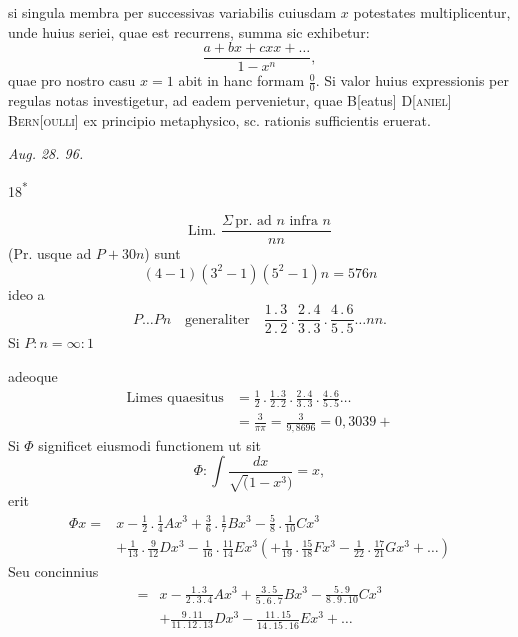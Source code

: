 si singula membra per successivas variabilis cuiusdam $x$ potestates
multiplicentur, unde huius seriei, quae est recurrens, summa sic exhibetur:
\[\frac{a+bx+cxx+\ldots}{1-x^n},\]
\noindent quae pro nostro casu $x=1$ abit in hanc formam $\frac00$. Si valor huius expressionis
per regulas notas investigetur, ad eadem pervenietur, quae B[eatus]
D[\textsc{aniel}] \textsc{Bern[oulli]} ex principio metaphysico, sc. rationis sufficientis eruerat.
\par\noindent\hfill\textit{Aug. 28. 96.}\par
\ClosingRule
\vfill\noindent\hfill18\textsuperscript{*}\hspace*{.12\linewidth}\par
\clearpage
{}
\[\text{Lim. }\frac{\Sigma\,\text{pr. ad }n\text{ infra }n}{nn}\]
\noindent (Pr. usque ad $P+30n$) sunt
\[(4-1)(3^2-1)(5^2-1)n=576n\]
\noindent ideo a
\[P\ldots Pn\quad\text{generaliter}\quad
\frac{1\mathpunct{.}3}{2\mathpunct{.}2}\mathpunct{.}\frac{2\mathpunct{.}4}{3\mathpunct{.}3}\mathpunct{.}\frac{4\mathpunct{.}6}{5\mathpunct{.}5}\ldots nn.\]
\noindent Si $P:n=\infty:1$
\par\noindent adeoque
\[\begin{aligned}
\text{Limes quaesitus}&=\tfrac12\mathpunct{.}\frac{1\mathpunct{.}3}{2\mathpunct{.}2}\mathpunct{.}\frac{2\mathpunct{.}4}{3\mathpunct{.}3}\mathpunct{.}\frac{4\mathpunct{.}6}{5\mathpunct{.}5}\ldots\\
&=\frac3{\pi\pi}=\frac3{9{,}8696}=0{,}3039+
\end{aligned}\]
\ClosingRule
{}
\noindent\hspace*{\parindent}Si $\Phi$ significet eiusmodi functionem ut sit
\[\Phi:\int\frac{dx}{\surd(1-x^3)}=x,\]
\noindent erit
\[\begin{aligned}
\Phi x={}&x-\tfrac12\mathpunct{.}\tfrac14Ax^3+\tfrac36\mathpunct{.}\tfrac17Bx^3-\tfrac58\mathpunct{.}\tfrac1{10}Cx^3\\
&+\tfrac1{13}\mathpunct{.}\tfrac9{12}Dx^3-\tfrac1{16}\mathpunct{.}\tfrac{11}{14}Ex^3
(+\tfrac1{19}\mathpunct{.}\tfrac{15}{18}Fx^3-\tfrac1{22}\mathpunct{.}\tfrac{17}{21}Gx^3+\ldots)
\end{aligned}\]
\noindent Seu concinnius
\[\begin{aligned}
={}&x-\frac{1\mathpunct{.}3}{2\mathpunct{.}3\mathpunct{.}4}Ax^3
+\frac{3\mathpunct{.}5}{5\mathpunct{.}6\mathpunct{.}7}Bx^3
-\frac{5\mathpunct{.}9}{8\mathpunct{.}9\mathpunct{.}10}Cx^3\\
&+\frac{9\mathpunct{.}11}{11\mathpunct{.}12\mathpunct{.}13}Dx^3
-\frac{11\mathpunct{.}15}{14\mathpunct{.}15\mathpunct{.}16}Ex^3+\ldots
\end{aligned}\]

